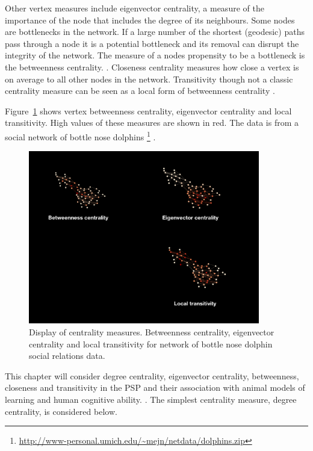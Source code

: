 Other vertex measures include eigenvector centrality, a measure of the importance of the node that includes the degree of its neighbours. \cite{bonacich1987power}  Some nodes are bottlenecks in the network. If a large number of the shortest (geodesic) paths pass through a node it is a potential bottleneck and its removal can disrupt the integrity of the network. The measure of a nodes propensity to be a bottleneck is the betweenness centrality. \cite{freeman1977set}. Closeness centrality measures how close a vertex is on average to all other nodes in the network. Transitivity though not a classic centrality measure can be seen as a local form of betweenness centrality \cite{newman2018networks}.

Figure~\ref{fig:dolphin} shows vertex betweenness centrality, eigenvector centrality and local transitivity. High values of these measures are shown in red. The data is from a social network of bottle nose dolphins \footnote{\url{http://www-personal.umich.edu/~mejn/netdata/dolphins.zip}} \cite{lusseau2003bottlenose} .

\begin{figure}
    \centering
    \includegraphics[width=0.9\textwidth]{images/centrality2.002.png}
    \caption{Display of centrality measures. Betweenness centrality, eigenvector centrality and local transitivity for network of bottle nose dolphin social relations data. \cite{lusseau2003bottlenose}}
    \label{fig:dolphin}
\end{figure}

This chapter will consider degree centrality, eigenvector centrality, betweenness, closeness and transitivity in the PSP and their association with animal models of learning and human cognitive ability. . The simplest centrality measure, degree centrality, \cite{newman2018networks} is considered below. 

